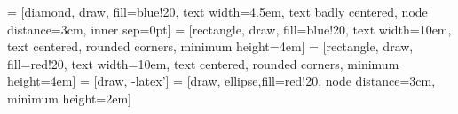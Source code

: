 \newcommand{\tdfrac} [2]{\ensuremath{\frac{\mathrm{d}   #1}{\mathrm{d} {#2}}}}%
\newcommand{\tddfrac}[2]{\ensuremath{\frac{\mathrm{d}^2 #1}{\mathrm{d} {#2}^2}}}%
\newcommand{\pdfrac} [2]{\ensuremath{\frac{\partial     #1}{\partial   {#2}}}}%
\newcommand{\pddfrac}[2]{\ensuremath{\frac{\partial^2   #1}{\partial   {#2}^2}}}%
\newcommand{\varfrac} [2]{\ensuremath{\frac{\delta     #1}{\delta   {#2}}}}%

\usepackage{shadethm}
\newenvironment{remark}[1][]{%
  \definecolor{shadethmcolor}{rgb}{.9,.9,.9}       %
  \definecolor{shaderulecolor}{rgb}{1.0,0.0,0.0}   %
  \setlength{\shadeboxrule}{1pt}%
  \begin{remark_}[#1]%
}{\end{remark_}}

\newenvironment{insertion}{
  \definecolor{shadethmcolor}{rgb}{0.9,0.8,.9}
  \definecolor{shaderulecolor}{rgb}{0.0,0.0,1}
  \setlength{\shadeboxrule}{1pt}
  \begin{insertion_}%
}{\end{insertion_}}

\newenvironment{auxcal}{
  \definecolor{shadethmcolor}{rgb}{0.7,0.9,0.9}
  \definecolor{shaderulecolor}{rgb}{0.0,0.1,0.1}
  \setlength{\shadeboxrule}{1pt}
  \begin{auxcal_}%
}{\end{auxcal_}}

\usepackage{tikz}
\usetikzlibrary{arrows}
\usetikzlibrary{shapes,arrows}
\usetikzlibrary{positioning}
\usetikzlibrary{fit}
\usetikzlibrary{shadows}

 = [diamond, draw, fill=blue!20, 
text width=4.5em, text badly centered, node distance=3cm, inner sep=0pt]
 = [rectangle, draw, fill=blue!20, 
text width=10em, text centered, rounded corners, minimum height=4em]
 = [rectangle, draw, fill=red!20, 
text width=10em, text centered, rounded corners, minimum height=4em]
 = [draw, -latex']
 = [draw, ellipse,fill=red!20, node distance=3cm, minimum height=2em]


